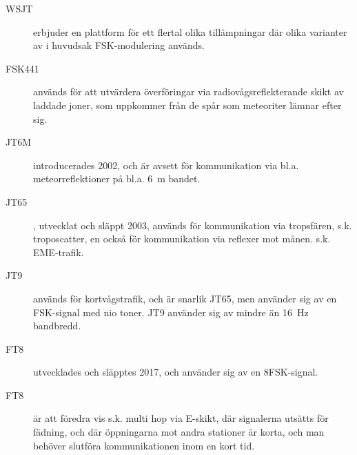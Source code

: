 \begin{description}
	\item[WSJT] erbjuder en plattform för ett flertal olika tillämpningar där olika
	varianter av i huvudsak FSK-modulering används.
	
	\item [FSK441] används för att utvärdera överföringar via radiovågsreflekterande skikt
	av laddade joner, som uppkommer från de spår som meteoriter lämnar efter sig.
	
	\item[JT6M] introducerades 2002, och är avsett för kommunikation via bl.a.
	meteorreflektioner på bl.a. 6~m bandet.
	
	\item[JT65], utvecklat och släppt 2003, används för kommunikation via tropsfären, s.k.
	troposcatter, en också för kommunikation via reflexer mot månen. s.k.
	EME-trafik.
	
	\item[JT9] används för kortvågstrafik, och är snarlik JT65, men använder sig av en
	FSK-signal med nio toner.
	JT9 använder sig av mindre än 16~Hz bandbredd.
	
	\item[FT8] utvecklades och släpptes 2017, och använder sig av en 8FSK-signal. 
	
	\item[FT8] är att föredra vis s.k. multi hop via E-skikt, där signalerna 
	utsätts för	fädning, och där öppningarna mot andra stationer är korta, 
	och man behöver slutföra kommunikationen inom en kort tid.
	
\end{description}

